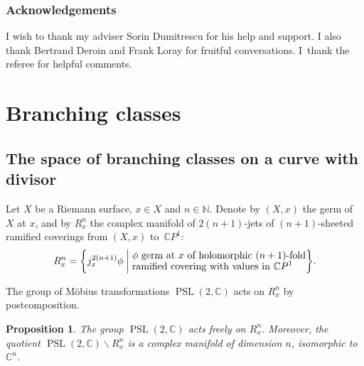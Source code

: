 \documentclass[JEP,XML,SOM,Unicode,NoEqCountersInSection,published]{cedram}
\newcommand{\C}{\mathbb C}
\newcommand{\N}{\mathbb N}
\newcommand{\CP}{\mathbb CP}
\DeclareMathOperator{\PSL}{PSL}
\theoremstyle{definition}
\theoremstyle{plain}
\newtheorem{proposition}[definition]{Proposition}
\begin{document}
\subsubsection*{Acknowledgements}
I wish to thank my adviser Sorin Dumitrescu for his help and support.
I also thank Bertrand Deroin and Frank Loray for fruitful conversations.
I~thank the referee for helpful comments.

\section{Branching classes}\label{section_branching_classes}

\subsection{The space of branching classes on a curve with divisor}

Let $X$ be a Riemann surface, $x \in X$ and $n \in \N$.
Denote by $(X, x)$ the germ of $X$ at $x$, and by $R_x^n$ the complex manifold of $2(n+1)$-jets of $(n+1)$-sheeted ramified coverings from $(X, x)$ to~$\CP^1$:
\begin{equation}\label{eq_space_jets_coverings}
R_x^n = \biggl\{j^{2(n+1)}_x \phi \biggm|
\begin{aligned}
&\text{$\phi$ germ at $x$ of holomorphic $(n+1)$-fold} \\[-5pt]
&\text{ramified covering with values in $\CP^1$}
\end{aligned}
\biggr\}.
\end{equation}

The group of Möbius transformations $\PSL(2, \C)$ acts on $R_x^n$ by postcomposition.

\begin{proposition}
The group $\PSL(2, \C)$ acts freely on $R_x^n$.
Moreover, the quotient $\PSL(2, \C) \backslash R_x^n$ is a complex manifold of dimension $n$, isomorphic to $\C^n$.
\end{proposition}
\end{document}

